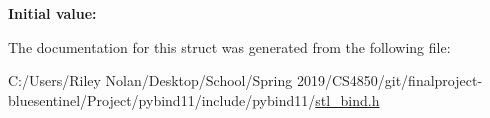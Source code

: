 {\bfseries Initial value\+:}
\begin{DoxyCode}{0}
\DoxyCodeLine{=}

\end{DoxyCode}


The documentation for this struct was generated from the following file\+:\begin{DoxyCompactItemize}
\item 
C\+:/\+Users/\+Riley Nolan/\+Desktop/\+School/\+Spring 2019/\+C\+S4850/git/finalproject-\/bluesentinel/\+Project/pybind11/include/pybind11/\mbox{\hyperlink{stl__bind_8h}{stl\+\_\+bind.\+h}}\end{DoxyCompactItemize}
